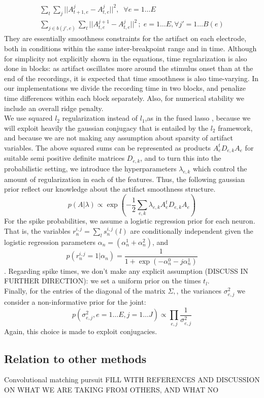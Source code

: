 \documentclass[12pt,letterpaper,fleqn]{article}
\begin{document}
\begin{eqnarray}
\nonumber \sum_t\sum_j ||A_{t+1,e}^j-A_{t,e}^j||^2,\;\;\forall e=1\ldots E \\
\nonumber \sum_{j\in b(j',e)}\sum_t ||A_{t,e}^{j+1}-A_{t,e}^j||^2\,;\; e=1\ldots E,\forall j' =1\ldots B(e)
\end{eqnarray}
They are essentially smoothness constraints for the artifact on each electrode, both in conditions within the same inter-breakpoint range and in time. Although for simplicity not explicitly shown in the equations, time regularization is also done in blocks: as artifact oscillates more around the stimulus onset than at the end of the recordings, it is expected that time smoothness is also time-varying. In our implementations we divide the recording time in two blocks, and penalize time differences within each block separately. Also, for numerical stability we include an overall ridge penalty.\\
We use squared $l_2$ regularization instead of $l_1$,as in the fused lasso \cite{TibshiraniEtal05}, because we will exploit heavily the gaussian conjugacy that is entailed by the $l_2$ framework, and because we are not making any assumption about sparsity of artifact variables. The above squared sums can be represented as products $A_e^tD_{e,k}A_e$ for suitable semi positive definite matrices $D_{e,k}$, and to turn this into the probabilistic setting, we introduce the hyperparameters $\lambda_{e,k} $ which control the amount of regularization in each of the features. Thus, the following gaussian prior reflect our knowledge about the artifact smoothness structure.
$$p(A|\lambda)\propto \exp\left(-\dfrac{1}{2} \sum_{e,k} \lambda_{e,k} A_e^tD_{e,k}A_e\right)$$
For the spike probabilities, we assume a logistic regression prior for each neuron. That is, the variables  $r_n^{i,j}=\sum_{l}s_n^{i,j}(l)$ are conditionally independent given the logistic regression parameters $\alpha_n=(\alpha_n^1+\alpha_n^2)$, and 
$$p(r_n^{i,j}=1|\alpha_n)=\dfrac{1}{1+\exp\left(-\alpha^0_n-j\alpha^1_n  \right)}$$. Regarding spike times, we don't make any explicit assumption (DISCUSS IN FURTHER DIRECTION): we set a uniform prior on the times $t_{l}$. \\
Finally, for the entries of the diagonal of the matrix $\Sigma,$, the variances $\sigma^2_{e,j}$ we consider a non-informative prior for the joint: $$p(\sigma^2_{e,j},e=1\ldots E,j=1\ldots J)\propto \prod_{e,j} \frac{1}{\sigma^2_{e,j}}$$
Again, this choice is made to exploit conjugacies.
\subsection{Relation to other methods}
Convolutional matching pursuit \cite{SzlamEtal10} \cite{PachitariuEtal13}
FILL WITH REFERENCES AND DISCUSSION ON WHAT WE ARE TAKING FROM OTHERS, AND WHAT NO
\end{document}
